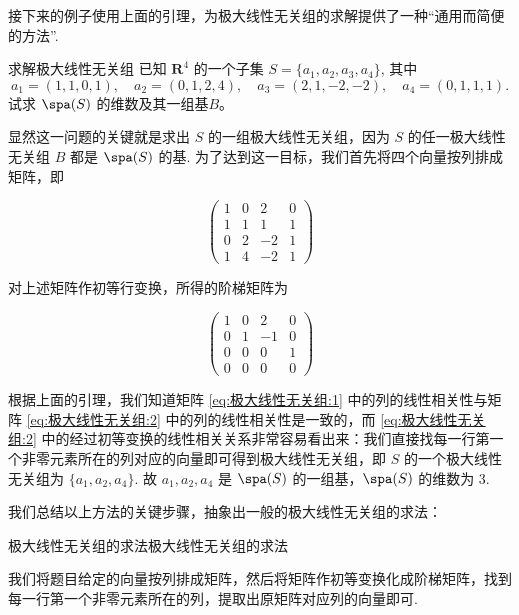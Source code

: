 接下来的例子使用上面的引理，为极大线性无关组的求解提供了一种``通用而简便的方法''.

\begin{example}{}{求解极大线性无关组}
    已知 $\mathbf{R}^4$ 的一个子集 $S = \{a_1, a_2, a_3, a_4\}$, 其中
    \[
        a_1 = (1,1,0,1), \quad a_2 = (0,1,2,4), \quad
        a_3 = (2,1,-2,-2), \quad a_4 = (0,1,1,1).
    \]
    试求 $\spa(S)$ 的维数及其一组基$B$。
\end{example}

\begin{solution}

    显然这一问题的关键就是求出 $S$ 的一组极大线性无关组，因为 $S$ 的任一极大线性无关组 $B$ 都是 $\spa(S)$ 的基. 为了达到这一目标，我们首先将四个向量按列排成矩阵，即

    \begin{equation} \label{eq:极大线性无关组:1}
        \begin{pmatrix}
            1 & 0 & 2  & 0 \\
            1 & 1 & 1  & 1 \\
            0 & 2 & -2 & 1 \\
            1 & 4 & -2 & 1
        \end{pmatrix}
    \end{equation}

    对上述矩阵作初等行变换，所得的阶梯矩阵为

    \begin{equation} \label{eq:极大线性无关组:2}
        \begin{pmatrix}
            1 & 0 & 2  & 0 \\
            0 & 1 & -1 & 0 \\
            0 & 0 & 0  & 1 \\
            0 & 0 & 0  & 0
        \end{pmatrix}
    \end{equation}

    根据上面的引理，我们知道矩阵 \eqref{eq:极大线性无关组:1} 中的列的线性相关性与矩阵 \eqref{eq:极大线性无关组:2} 中的列的线性相关性是一致的，而 \eqref{eq:极大线性无关组:2} 中的经过初等变换的线性相关关系非常容易看出来：我们直接找每一行第一个非零元素所在的列对应的向量即可得到极大线性无关组，即 $S$ 的一个极大线性无关组为 $\{a_1, a_2, a_4\}$. 故 $a_1, a_2, a_4$ 是 $\spa(S)$ 的一组基，$\spa(S)$ 的维数为 3.
\end{solution}

我们总结以上方法的关键步骤，抽象出一般的极大线性无关组的求法：
\begin{lemma}{极大线性无关组的求法}{极大线性无关组的求法}

    我们将题目给定的向量按列排成矩阵，然后将矩阵作初等变换化成阶梯矩阵，找到每一行第一个非零元素所在的列，提取出原矩阵对应列的向量即可.
\end{lemma}

